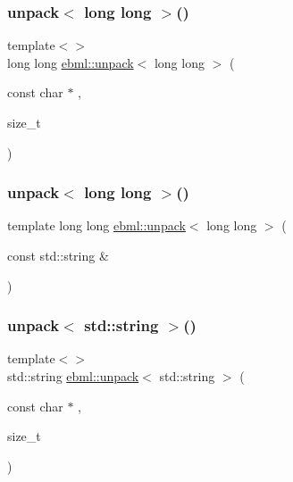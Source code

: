 \mbox{\label{namespaceebml_abb67ef3f7f8a4e21d3aa99d928dd715c}} 
\subsubsection{\texorpdfstring{unpack$<$ long long $>$()}{unpack< long long >()}\hspace{0.1cm}{\footnotesize\ttfamily [1/2]}}
{\footnotesize\ttfamily template$<$$>$ \\
long long \mbox{\hyperlink{namespaceebml_a55a0f9d0c93e80d488021fd03c4f3861}{ebml\+::unpack}}$<$ long long $>$ (\begin{DoxyParamCaption}\item[{const char $\ast$}]{,  }\item[{size\+\_\+t}]{ }\end{DoxyParamCaption})}

\mbox{\label{namespaceebml_aee739b2993a6e10f162ee2346d77d17c}} 
\subsubsection{\texorpdfstring{unpack$<$ long long $>$()}{unpack< long long >()}\hspace{0.1cm}{\footnotesize\ttfamily [2/2]}}
{\footnotesize\ttfamily template long long \mbox{\hyperlink{namespaceebml_a55a0f9d0c93e80d488021fd03c4f3861}{ebml\+::unpack}}$<$ long long $>$ (\begin{DoxyParamCaption}\item[{const std\+::string \&}]{ }\end{DoxyParamCaption})}

\mbox{\label{namespaceebml_ad8250743a22e62d2cdee2b695870398e}} 
\subsubsection{\texorpdfstring{unpack$<$ std\+::string $>$()}{unpack< std::string >()}\hspace{0.1cm}{\footnotesize\ttfamily [1/2]}}
{\footnotesize\ttfamily template$<$$>$ \\
std\+::string \mbox{\hyperlink{namespaceebml_a55a0f9d0c93e80d488021fd03c4f3861}{ebml\+::unpack}}$<$ std\+::string $>$ (\begin{DoxyParamCaption}\item[{const char $\ast$}]{,  }\item[{size\+\_\+t}]{ }\end{DoxyParamCaption})}

